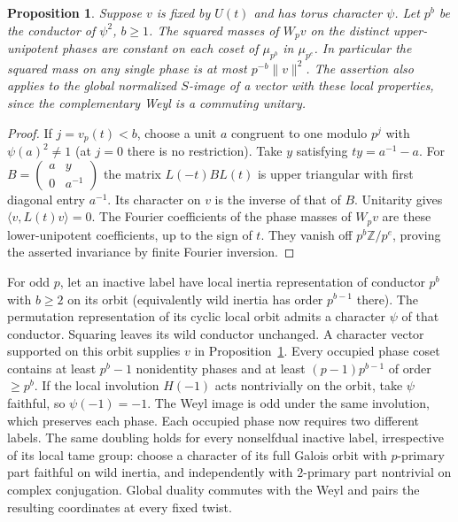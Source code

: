 \documentclass[11pt,a4paper]{article}
\numberwithin{equation}{section}
\newtheorem{proposition}[theorem]{Proposition}
\theoremstyle{remark}
\newcommand{\ZZ}{\mathbb Z}
\begin{document}
\begin{proposition}\label{por:prop:wild}
Suppose $v$ is fixed by $U(t)$ and has torus character $\psi$. Let $p^b$ be the conductor of $\psi^2$, $b\ge1$. The squared masses of $W_pv$ on the distinct upper-unipotent phases are constant on each coset of $\mu_{p^b}$ in $\mu_{p^e}$. In particular the squared mass on any single phase is at most $p^{-b}\|v\|^2$. The assertion also applies to the global normalized $S$-image of a vector with these local properties, since the complementary Weyl is a commuting unitary.
\end{proposition}
\begin{proof}
If $j=v_p(t)<b$, choose a unit $a$ congruent to one modulo $p^j$ with $\psi(a)^2\ne1$ (at $j=0$ there is no restriction). Take $y$ satisfying $ty=a^{-1}-a$. For
$B=\left(\begin{smallmatrix}a&y\\0&a^{-1}\end{smallmatrix}\right)$ the matrix $L(-t)BL(t)$ is upper triangular with first diagonal entry $a^{-1}$. Its character on $v$ is the inverse of that of $B$. Unitarity gives $\langle v,L(t)v\rangle=0$. The Fourier coefficients of the phase masses of $W_pv$ are these lower-unipotent coefficients, up to the sign of $t$. They vanish off $p^b\ZZ/p^e$, proving the asserted invariance by finite Fourier inversion.
\end{proof}

For odd $p$, let an inactive label have local inertia representation of conductor $p^b$ with $b\ge2$ on its orbit (equivalently wild inertia has order $p^{b-1}$ there). The permutation representation of its cyclic local orbit admits a character $\psi$ of that conductor. Squaring leaves its wild conductor unchanged. A character vector supported on this orbit supplies $v$ in Proposition~\ref{por:prop:wild}. Every occupied phase coset contains at least $p^b-1$ nonidentity phases and at least $(p-1)p^{b-1}$ of order $\ge p^b$. If the local involution $H(-1)$ acts nontrivially on the orbit, take $\psi$ faithful, so $\psi(-1)=-1$. The Weyl image is odd under the same involution, which preserves each phase. Each occupied phase now requires two different labels. The same doubling holds for every nonselfdual inactive label, irrespective of its local tame group: choose a character of its full Galois orbit with $p$-primary part faithful on wild inertia, and independently with $2$-primary part nontrivial on complex conjugation. Global duality commutes with the Weyl and pairs the resulting coordinates at every fixed twist.
\end{document}
